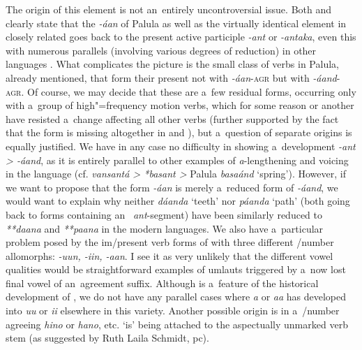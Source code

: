 The origin of this element is not an~entirely uncontroversial issue. Both \citet[22]{morgenstierne1941} and \citet[48]{buddruss1967} clearly state that the \textit{-áan} of Palula as well as the virtually identical element in closely related  goes back to the  present active participle \textit{-ant} or \textit{-antaka}, even this with numerous parallels (involving various degrees of reduction) in other  languages \citep[270--271]{masica1991}. What complicates the picture is the small class of verbs in Palula, already mentioned, that form their present  not with \textit{-áan}-\textsc{agr} but with \textit{-áand}-\textsc{agr}. Of course, we may decide that these are a~few residual forms, occurring only with a~group of high"=frequency motion verbs, which for some reason or another have resisted a~change affecting all other verbs (further supported by the fact that the form is missing altogether in  and ), but a~question of separate origins is equally justified. We have in any case no difficulty in showing a~development \textit{-ant {\textgreater} -áand}, as it is entirely parallel to other examples of \textit{a}-lengthening and voicing in the language (cf.  \textit{vansantá {\textgreater} *basant {\textgreater}} Palula \textit{basaánd} `spring'). However, if we want to propose that the form \textit{-áan} is merely a~reduced form of \textit{-áand}, we would want to explain why neither \textit{dáanda} `teeth' nor \textit{páanda} `path' (both going back to forms containing an~ \textit{ant}-segment) have been similarly reduced to \textit{**daana} and \textit{**paana} in the modern languages. We also have a~particular problem posed by the im/present verb forms of  with three different /number allomorphs: \textit{-uun, -iin, -aan}. I see it as very unlikely that the different vowel qualities would be straightforward examples of umlauts triggered by a~now lost final vowel of an~agreement suffix. Although  is a~feature of the historical development of , we do not have any parallel cases where \textit{‌a‌} or \textit{‌aa‌} has developed into \textit{‌uu‌} or \textit{‌ii‌} elsewhere in this variety. Another possible origin is in a~/number agreeing  \textit{hino} or \textit{hano}, etc. `is' being attached to the aspectually unmarked verb stem (as suggested by Ruth Laila Schmidt, pc). 



